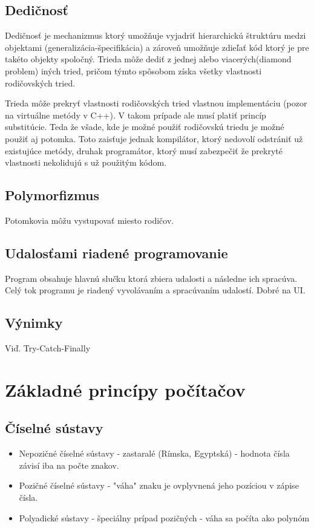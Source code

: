 \documentclass[a4paper,10pt]{article}
\begin{document}
\begin{multicols}{2}
	\subsection{Dedičnosť}
	
		Dedičnosť je mechanizmus ktorý umožňuje vyjadriť hierarchickú štruktúru medzi objektami (generalizácia-špecifikácia) a zároveň umožňuje zdieľať kód ktorý je pre takéto objekty spoločný. Trieda môže dediť z jednej alebo viacerých(diamond problem) iných tried, pričom týmto spôsobom získa všetky vlastnosti rodičovských tried.
		
		Trieda môže prekryť vlastnosti rodičovských tried vlastnou implementáciu (pozor na virtuálne metódy v C++). V takom prípade ale musí platiť princíp substitúcie. Teda že všade, kde je možné použiť rodičovskú triedu je možné použiť aj potomka. Toto zaisťuje jednak kompilátor, ktorý nedovolí odstrániť už existujúce metódy, druhak programátor, ktorý musí zabezpečiť že prekryté vlastnosti nekolidujú s už použitým kódom.

	\subsection{Polymorfizmus}
	
		Potomkovia môžu vystupovať miesto rodičov.
		
	\subsection{Udalosťami riadené programovanie}
	
		Program obsahuje hlavnú slučku ktorá zbiera udalosti a následne ich spracúva. Celý tok programu je riadený vyvolávaním a spracúvaním udalostí. Dobré na UI.
		
	\subsection{Výnimky}
	
		Viď. Try-Catch-Finally

\section{Základné princípy počítačov}

	\subsection{Číselné sústavy}

		\begin{itemize}
			\item Nepozičné číselné sústavy - zastaralé (Rímska, Egyptská) - hodnota čísla závisí iba na počte znakov.
			\item Pozičné číselné sústavy - "váha" znaku je ovplyvnená jeho pozíciou v zápise čísla.
			\item Polyadické sústavy - špeciálny prípad pozičných - váha sa počíta ako polynóm
		\end{itemize}
	

\end{multicols}
\end{document}
